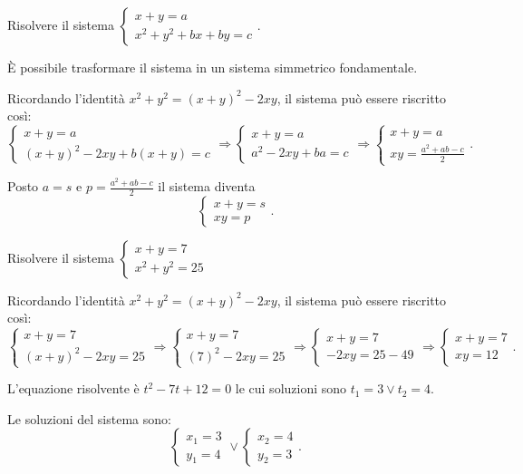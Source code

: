 \begin{esempio}{}{}
Risolvere il sistema 
\(\left\{\begin{array}{l}{x+y=a}\\{x^2+y^2+{bx}+{by}=c}\end{array}\right.\).

È possibile trasformare il sistema in un sistema simmetrico fondamentale.

Ricordando l'identità \(x^2+y^2=(x+y)^2-2{xy}\), il sistema può essere riscritto 
così: 
\[ \left\{\begin{array}{l}{x+y=a}\\
{(x+y)^2-2{xy}+b(x+y)=c}\end{array}\right.
\Rightarrow \left\{\begin{array}{l}{x+y=a}\\
{a^2-2{xy}+{ba}=c}\end{array}\right.
\Rightarrow \left\{\begin{array}{l}{x+y=a}\\
{{xy}=\frac{a^2+{ab}-c} 2}\end{array}\right..\]

Posto \(a=s\) e \(p=\frac{a^2+{ab}-c} 2\) il sistema diventa 
\[\left\{\begin{array}{l}{x+y=s}\\{{xy}=p}\end{array}\right..\]
\end{esempio}

\begin{esempio}{}{}
Risolvere il sistema 
\(\left\{\begin{array}{l}{x+y=7}\\{x^2+y^2=25}\end{array}\right.\)

Ricordando l'identità \(x^2+y^2=(x+y)^2-2{xy}\), il sistema può essere riscritto 
così: 
\[\left\{\begin{array}{l}{x+y=7}\\
{(x+y)^2-2{xy}=25}\end{array}\right.
\Rightarrow \left\{\begin{array}{l}{x+y=7}\\
{(7)^2-2{xy}=25}\end{array}\right.
\Rightarrow \left\{\begin{array}{l}{x+y=7}\\
{-2{xy}=25-49}\end{array}\right.\Rightarrow 
\left\{\begin{array}{l}{x+y=7}\\{{xy}=12}\end{array}\right..\]

L'equazione risolvente è \(t^2-7t+12=0\) le cui soluzioni sono \(t_1=3\vee 
t_2=4\).

Le soluzioni del sistema sono: 
\[\left\{\begin{array}{l}{x_1=3}\\
{y_1=4}\end{array}\right.\vee \left\{\begin{array}{l}{x_2=4}\\
{y_2=3}\end{array}\right..\]
\end{esempio}

